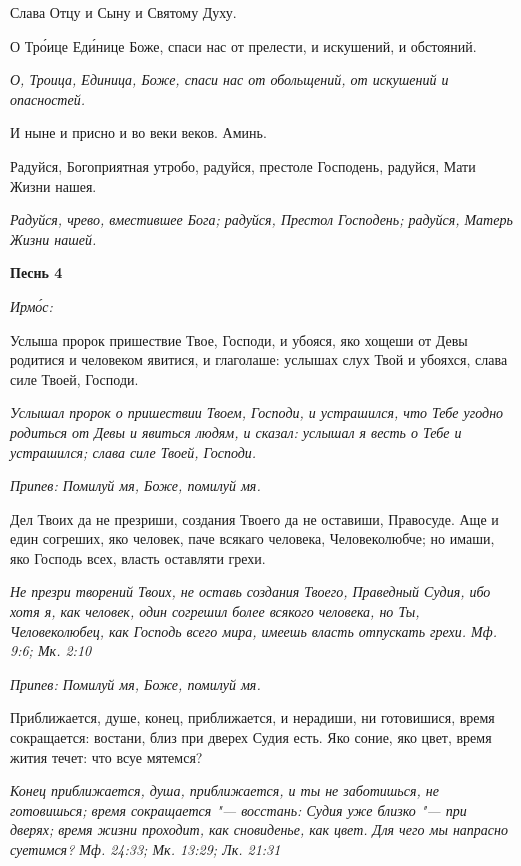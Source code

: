 Слава Отцу и Сыну и Святому Духу.


О Тро́ице Еди́нице Боже, спаси нас от прелести, и искушений, и обстояний.


\itshape О, Троица, Единица, Боже, спаси нас от обольщений, от искушений и опасностей.\normalfont{}


И ныне и присно и во веки веков. Аминь.


Радуйся, Богоприятная утробо, радуйся, престоле Господень, радуйся, Мати Жизни нашея.


\itshape Радуйся, чрево, вместившее Бога; радуйся, Престол Господень; радуйся, Матерь Жизни нашей.\normalfont{}





\bfseries Песнь 4\normalfont{}


\itshape Ирмо́с:\normalfont{}


Услыша пророк пришествие Твое, Господи, и убояся, яко хощеши от Девы родитися и человеком явитися, и глаголаше: услышах слух Твой и убояхся, слава силе Твоей, Господи.


\itshape Услышал пророк о пришествии Твоем, Господи, и устрашился, что Тебе угодно родиться от Девы и явиться людям, и сказал: услышал я весть о Тебе и устрашился; слава силе Твоей, Господи.\normalfont{}


\itshape Припев:\normalfont{} Помилуй мя, Боже, помилуй мя.


Дел Твоих да не презриши, создания Твоего да не оставиши, Правосуде. Аще и един согреших, яко человек, паче всякаго человека, Человеколюбче; но имаши, яко Господь всех, власть оставляти грехи.


\itshape Не презри творений Твоих, не оставь создания Твоего, Праведный Судия, ибо хотя я, как человек, один согрешил более всякого человека, но Ты, Человеколюбец, как Господь всего мира, имеешь власть отпускать грехи. Мф. 9:6; Мк. 2:10\normalfont{}


\itshape Припев:\normalfont{} Помилуй мя, Боже, помилуй мя.


Приближается, душе, конец, приближается, и нерадиши, ни готовишися, время сокращается: востани, близ при дверех Судия есть. Яко соние, яко цвет, время жития течет: что всуе мятемся?


\itshape Конец приближается, душа, приближается, и ты не заботишься, не готовишься; время сокращается "--- восстань: Судия уже близко "--- при дверях; время жизни проходит, как сновиденье, как цвет. Для чего мы напрасно суетимся? Мф. 24:33; Мк. 13:29; Лк. 21:31\normalfont{}


